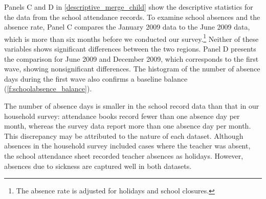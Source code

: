 \documentclass[fleqn,11pt]{article}
\begin{document}
Panels C and D in \autoref{descriptive_merge_child} show the descriptive statistics for the data from the school attendance records. To examine  school absences and the absence rate, Panel C compares the January 2009 data to the June 2009 data, which is more than six months before we conducted our survey.\footnote{The absence rate is adjusted for holidays and school closures.} Neither of these variables shows significant differences between the two regions. Panel D presents the comparison for June 2009 and December 2009, which corresponds to the first wave, showing nonsignificant differences. The histogram of the number of absence days during the first wave also confirms a baseline balance (\autoref{f:schoolabsence_balance}).

The number of absence days is smaller in the school record data than that in our household survey: attendance books record fewer than one absence day per month, whereas the survey data report more than one absence day per month. This discrepancy may be attributed to the nature of each dataset. Although absences in the household survey included cases where the teacher was absent, the school attendance sheet recorded teacher absences as holidays. However, absences due to sickness are captured well in both datasets.




\end{document}
